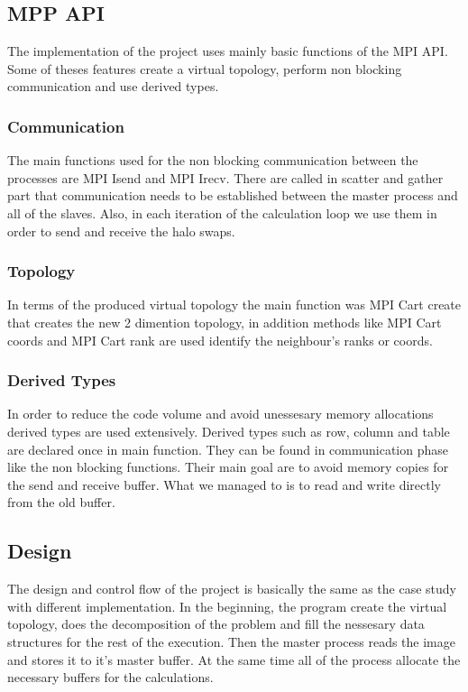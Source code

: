 \documentclass[12pt,a4paper]{article}
\begin{document}
	\subsection{MPP API}
	The implementation of the project uses mainly basic functions of the MPI API. Some of theses features create a virtual topology, perform non blocking communication and use derived types.

		\subsubsection{Communication}
		The main functions used for the non blocking communication between the processes are MPI Isend and MPI Irecv. There are called in scatter and gather part that communication needs to be established between the master process and all of the slaves. Also, in each iteration of the calculation loop we use them in order to send and receive the halo swaps.

		\subsubsection{Topology}
		In terms of the produced virtual topology the main function was MPI Cart create that creates the new 2 dimention topology, in addition methods like MPI Cart coords and MPI Cart rank are used identify the neighbour's ranks or coords.

		\subsubsection{Derived Types}
		In order to reduce the code volume and avoid unessesary memory allocations derived types are used extensively. Derived types such as row, column and table are declared once in main function. They can be found in communication phase like the non blocking functions. Their main goal are to avoid memory copies for the send and receive buffer. What we managed to is to read and write directly from the old buffer.

	\subsection{Design}
	The design and control flow of the project is basically the same as the case study with different implementation. In the beginning, the program create the virtual topology, does the decomposition of the problem and fill the nessesary data structures for the rest of the execution. Then the master process reads the image and stores it to it's master buffer. At the same time all of the process allocate the necessary buffers for the calculations.
\end{document}
